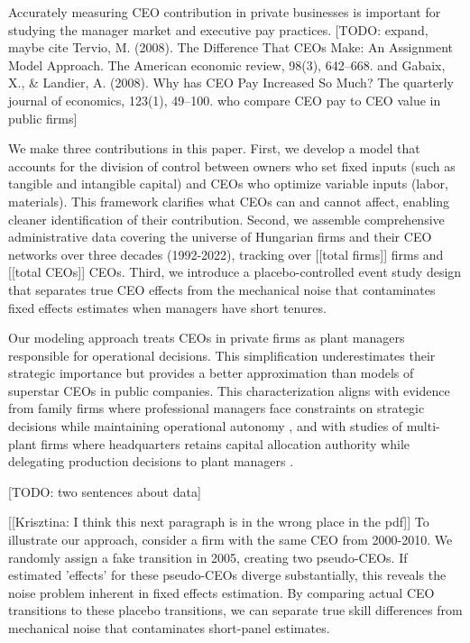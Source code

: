 \documentclass[11pt,a4paper]{article}
\begin{document}
Accurately measuring CEO contribution in private businesses is important for studying the manager market and executive pay practices. [TODO: expand, maybe cite Tervio, M. (2008). The Difference That CEOs Make: An Assignment Model Approach. The American economic review, 98(3), 642–668. and Gabaix, X., & Landier, A. (2008). Why has CEO Pay Increased So Much? The quarterly journal of economics, 123(1), 49–100. who compare CEO pay to CEO value in public firms]

We make three contributions in this paper. First, we develop a model that accounts for the division of control between owners who set fixed inputs (such as tangible and intangible capital) and CEOs who optimize variable inputs (labor, materials). This framework clarifies what CEOs can and cannot affect, enabling cleaner identification of their contribution. Second, we assemble comprehensive administrative data covering the universe of Hungarian firms and their CEO networks over three decades (1992-2022), tracking over [[total firms]] firms and [[total CEOs]] CEOs. Third, we introduce a placebo-controlled event study design that separates true CEO effects from the mechanical noise that contaminates fixed effects estimates when managers have short tenures.

Our modeling approach treats CEOs in private firms as plant managers responsible for operational decisions. This simplification underestimates their strategic importance but provides a better approximation than models of superstar CEOs in public companies. This characterization aligns with evidence from family firms where professional managers face constraints on strategic decisions while maintaining operational autonomy \citep{zellweger2012managing}, and with studies of multi-plant firms where headquarters retains capital allocation authority while delegating production decisions to plant managers \citep{bloom2012americans}.

[TODO: two sentences about data]

[[Krisztina: I think this next paragraph is in the wrong place in the pdf]]
To illustrate our approach, consider a firm with the same CEO from 2000-2010. We randomly assign a fake transition in 2005, creating two pseudo-CEOs. If estimated 'effects' for these pseudo-CEOs diverge substantially, this reveals the noise problem inherent in fixed effects estimation. By comparing actual CEO transitions to these placebo transitions, we can separate true skill differences from mechanical noise that contaminates short-panel estimates.
\end{document}
